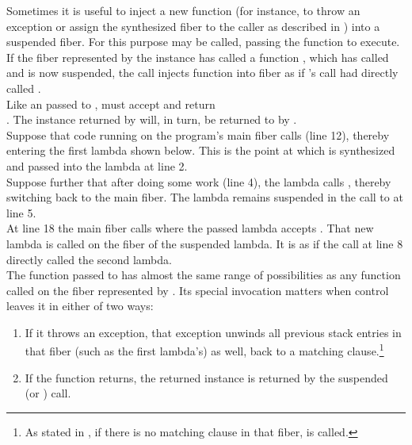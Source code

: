 \label{resumewith}
Sometimes it is useful to inject a new function (for instance, to throw an
exception or assign the synthesized fiber to the caller as described in
) into a suspended fiber. For this purpose
 may be called, passing the function  to
execute.\\
If the fiber represented by the \fiber instance  has called a function
, which has called \resume and is now suspended, the call 
 injects function  into fiber  as
if 's \resume call had directly called .\\

Like an \entryfn\xspace passed to \fiber,  must accept
 and return\\
\fiber. The \fiber instance returned by  will, in turn, be returned
to  by \resume.\\

Suppose that code running on the program's main fiber calls \resume (line 12), thereby
entering the first lambda shown below. This is the point at which  is
synthesized and passed into the lambda at line 2.\\
Suppose further that after doing some work (line 4), the lambda calls
, thereby switching back to the main fiber. The lambda remains
suspended in the call to  at line 5.\\
At line 18 the main fiber calls  where the passed lambda
accepts . That new lambda is called on the fiber of the suspended
lambda. It is as if the  call at line 8 directly called the second
lambda.\\

The function passed to \resumewith has almost the same range of possibilities as
any function called on the fiber represented by . Its special invocation
matters when control leaves it in either of two ways:

\begin{enumerate}
  \item If it throws an exception, that exception unwinds all previous stack
        entries in that fiber (such as the first lambda's) as well, back to
        a matching  clause.\footnote{As stated
        in , if there is no matching 
        clause in that fiber,  is called.}
  \item If the function returns, the returned \fiber instance is returned by
        the suspended  (or \resumewith) call.
\end{enumerate}

